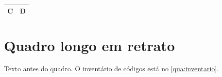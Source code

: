 \begin{quadro}[htbp]
\begin{ilustracao}{\caption{Terceiro quadro comum}\label{qua:tres}}{\elaboracaopropria}
\begin{tabularx}{\linewidth}{|l|X|}\hline C & D \\\hline\end{tabularx}
\end{ilustracao}
\end{quadro}

\chapter{Quadro longo em retrato}\label{sec:b}

Texto antes do quadro. O inventário de códigos está no \autoref{qua:inventario}.

